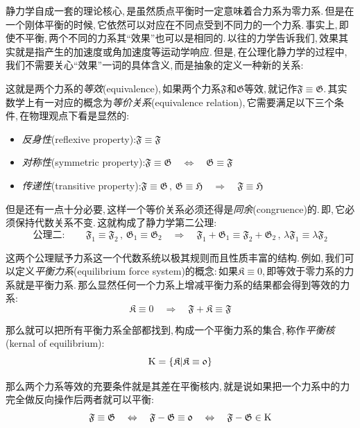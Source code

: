 静力学自成一套的理论核心,\,是虽然质点平衡时一定意味着合力系为零力系.\,但是在一个刚体平衡的时候,\,它依然可以对应在不同点受到不同力的一个力系.\,事实上,\,即使不平衡,\,两个不同的力系其``效果''也可以是相同的.\,以往的力学告诉我们,\,效果其实就是指产生的加速度或角加速度等运动学响应.\,但是,\,在公理化静力学的过程中,\,我们不需要关心``效果''一词的具体含义,\,而是抽象的定义一种新的关系:

这就是两个力系的\emph{等效}(equivalence),\,如果两个力系$\mathfrak{F}$和$\mathfrak{G}$等效,\,就记作$\mathfrak{F}\equiv\mathfrak{G}$.\,其实数学上有一对应的概念为\emph{等价关系}(equivalence relation),\,它需要满足以下三个条件,\,在物理观点下看是显然的:
\begin{itemize}
  \item \emph{反身性}(reflexive property):\qquad$\mathfrak{F}\equiv\mathfrak{F}$
  \item \emph{对称性}(symmetric property):\qquad$\mathfrak{F}\equiv\mathfrak{G}\quad \Leftrightarrow\quad\mathfrak{G}\equiv\mathfrak{F} $
  \item \emph{传递性}(transitive property):\qquad$\mathfrak{F}\equiv\mathfrak{G}\,,\,\mathfrak{G}\equiv\mathfrak{H}\quad \Rightarrow\quad\mathfrak{F}\equiv\mathfrak{H} $
\end{itemize}

但是还有一点十分必要,\,这样一个等价关系必须还得是\emph{同余}(congruence)的.\,即,\,它必须保持代数关系不变.\,这就构成了静力学第二公理:
\[\text{公理二}:\qquad \mathfrak{F}_1\equiv\mathfrak{F}_2\,,\,\mathfrak{G}_1\equiv\mathfrak{G}_2\quad \Rightarrow \quad \mathfrak{F}_1+\mathfrak{G}_1\equiv\mathfrak{F}_2+\mathfrak{G}_2\,,\,\lambda\mathfrak{F}_1\equiv\lambda\mathfrak{F}_2\]

这两个公理赋予力系这一个代数系统以极其规则而且性质丰富的结构.\,例如,\,我们可以定义\emph{平衡力系}(equilibrium force system)的概念:\,如果$\mathfrak{K}\equiv \mathfrak{0}$,\,即等效于零力系的力系就是平衡力系.\,那么显然任何一个力系上增减平衡力系的结果都会得到等效的力系:
\[\mathfrak{K}\equiv \mathfrak{0}\quad \Rightarrow \quad \mathfrak{F}+\mathfrak{K}\equiv \mathfrak{F}\]

那么就可以把所有平衡力系全部都找到,\,构成一个平衡力系的集合,\,称作\emph{平衡核}(kernal of equilibrium):
\[{\rm K}=\{\mathfrak{K}|\mathfrak{K}\equiv \mathfrak{0}\}\]

那么两个力系等效的充要条件就是其差在平衡核内,\,就是说如果把一个力系中的力完全做反向操作后两者就可以平衡:
\[\mathfrak{F}\equiv \mathfrak{G}\quad \Leftrightarrow \quad \mathfrak{F}- \mathfrak{G}\equiv \mathfrak{0}\quad \Leftrightarrow \quad \mathfrak{F}- \mathfrak{G}\in {\rm K}\]

